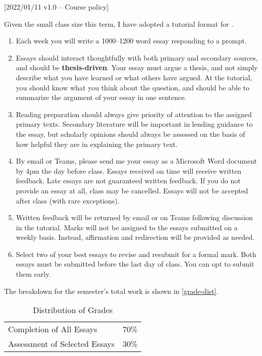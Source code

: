 [2022/01/11 v1.0 -- Course policy]


Given the small class size this term, I have adopted a tutorial format
for \ccode.

\begin{enumerate}

	\item Each week you will write a 1000–1200 word essay responding to
	a prompt.

	\item Essays should interact thoughtfully with both primary and
	secondary sources, and should be \textbf{thesis-driven}. Your essay
	must argue a thesis, and not simply describe what you have learned
	or what others have argued. At the tutorial, you should know what
	you think about the question, and should be able to summarize the
	argument of your essay in one sentence.

	\item Reading preparation should always give priority of attention
	to the assigned primary texts. Secondary literature will be
	important in lending guidance to the essay, but scholarly opinions
	should always be assessed on the basis of how helpful they are in
	explaining the primary text.

	\item By email or Teams, please send me your essay as a Microsoft
	Word document by 4pm the day before class. Essays received on time
	will receive written feedback. Late essays are not guaranteed
	written feedback. If you do not provide an essay at all, class may
	be cancelled. Essays will not be accepted after class (with rare
	exceptions).

	\item Written feedback will be returned by email or on Teams
	following discussion in the tutorial. Marks will not be assigned to
	the essays submitted on a weekly basis. Instead, affirmation and
	redirection will be provided as needed.

	\item Select two of your best essays to revise and resubmit for a
	formal mark. Both essays must be submitted before the last day of
	class. You can opt to submit them early.

\end{enumerate}

The breakdown for the semester's total work is shown in
\autoref{grade-dist}.

\begin{table}[htbp]
  \centering
  {\lining
  \begin{tabular}{lr}
    \toprule
    Completion of All Essays      & 70\% \\
    Assessment of Selected Essays & 30\% \\
    \bottomrule
  \end{tabular}}
  \caption{Distribution of Grades}
  \label{grade-dist}
\end{table}
